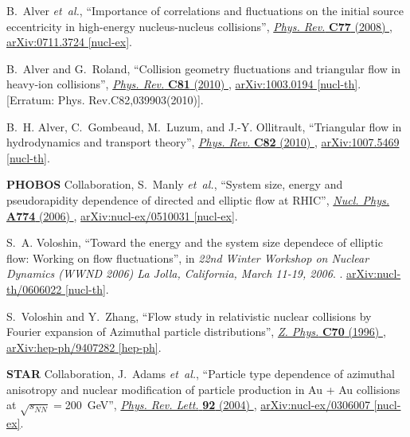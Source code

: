 \documentclass[ALICE,manyauthors]{cernphprep}
\begin{document}
\begin{thebibliography}{10}
B.~Alver {\em et~al.}, ``{Importance of correlations and fluctuations on the
  initial source eccentricity in high-energy nucleus-nucleus collisions}'',
  \href{http://dx.doi.org/10.1103/PhysRevC.77.014906}{{\em Phys. Rev.}
  {\bfseries C77} (2008) },
\href{http://arxiv.org/abs/0711.3724}{{\ttfamily arXiv:0711.3724 [nucl-ex]}}.

B.~Alver and G.~Roland, ``{Collision geometry fluctuations and triangular flow
  in heavy-ion collisions}'',
  \href{http://dx.doi.org/10.1103/PhysRevC.82.039903,
  10.1103/PhysRevC.81.054905}{{\em Phys. Rev.} {\bfseries C81} (2010) },
  \href{http://arxiv.org/abs/1003.0194}{{\ttfamily arXiv:1003.0194 [nucl-th]}}.
[Erratum: Phys. Rev.C82,039903(2010)].

B.~H. Alver, C.~Gombeaud, M.~Luzum, and J.-Y. Ollitrault, ``{Triangular flow in
  hydrodynamics and transport theory}'',
  \href{http://dx.doi.org/10.1103/PhysRevC.82.034913}{{\em Phys. Rev.}
  {\bfseries C82} (2010) },
\href{http://arxiv.org/abs/1007.5469}{{\ttfamily arXiv:1007.5469 [nucl-th]}}.

{\bfseries PHOBOS} Collaboration, S.~Manly {\em et~al.}, ``{System size, energy
  and pseudorapidity dependence of directed and elliptic flow at RHIC}'',
  \href{http://dx.doi.org/10.1016/j.nuclphysa.2006.06.079}{{\em Nucl. Phys.}
  {\bfseries A774} (2006) },
\href{http://arxiv.org/abs/nucl-ex/0510031}{{\ttfamily arXiv:nucl-ex/0510031
  [nucl-ex]}}.

S.~A. Voloshin, ``{Toward the energy and the system size dependece of elliptic
  flow: Working on flow fluctuations}'', in {\em {22nd Winter Workshop on
  Nuclear Dynamics (WWND 2006) La Jolla, California, March 11-19, 2006}}.
.
\newblock
\href{http://arxiv.org/abs/nucl-th/0606022}{{\ttfamily arXiv:nucl-th/0606022
  [nucl-th]}}.
\newblock

S.~Voloshin and Y.~Zhang, ``{Flow study in relativistic nuclear collisions by
  Fourier expansion of Azimuthal particle distributions}'',
  \href{http://dx.doi.org/10.1007/s002880050141}{{\em Z. Phys.} {\bfseries C70}
  (1996) },
\href{http://arxiv.org/abs/hep-ph/9407282}{{\ttfamily arXiv:hep-ph/9407282
  [hep-ph]}}.

{\bfseries STAR} Collaboration, J.~Adams {\em et~al.}, ``{Particle type
  dependence of azimuthal anisotropy and nuclear modification of particle
  production in Au + Au collisions at $\sqrt{s_{NN}} = $200~GeV}'',
  \href{http://dx.doi.org/10.1103/PhysRevLett.92.052302}{{\em Phys. Rev. Lett.}
  {\bfseries 92} (2004) },
\href{http://arxiv.org/abs/nucl-ex/0306007}{{\ttfamily arXiv:nucl-ex/0306007
  [nucl-ex]}}.


\end{thebibliography}
\end{document}
